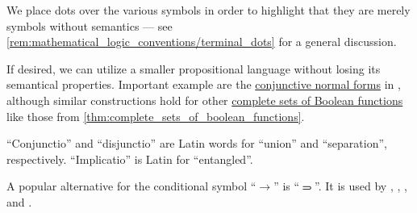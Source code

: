 \begin{comments}
  \item We place dots over the various symbols in order to highlight that they are merely symbols without semantics --- see \cref{rem:mathematical_logic_conventions/terminal_dots} for a general discussion.

  \item If desired, we can utilize a smaller propositional language without losing its semantical properties. Important example are the \hyperref[def:cnf_and_dnf]{conjunctive normal forms} in , although similar constructions hold for other \hyperref[def:boolean_closure/complete]{complete sets of Boolean functions} like those from \cref{thm:complete_sets_of_boolean_functions}.

  \item \enquote{Conjunctio} and \enquote{disjunctio} are Latin words for \enquote{union} and \enquote{separation}, respectively. \enquote{Implicatio} is Latin for \enquote{entangled}.

  \item A popular alternative for the conditional symbol \enquote{\( \rightarrow \)} is \enquote{\( \rightimply \)}. It is used by , , ,  and .
\end{comments}

